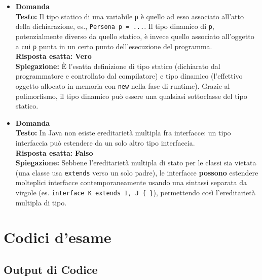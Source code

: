 \documentclass[12pt, a4paper]{article}
\begin{document}
\begin{itemize}
    \item {}\textbf{Domanda \thedomanda} \\
    \textbf{Testo:} Il tipo statico di una variabile \texttt{p} è quello ad esso associato all'atto della dichiarazione, es., \texttt{Persona p = ...}. Il tipo dinamico di \texttt{p}, potenzialmente diverso da quello statico, è invece quello associato all'oggetto a cui \texttt{p} punta in un certo punto dell'esecuzione del programma. \\
    \textbf{Risposta esatta:} \textbf{Vero} \\
    \textbf{Spiegazione:} È l'esatta definizione di tipo statico (dichiarato dal programmatore e controllato dal compilatore) e tipo dinamico (l'effettivo oggetto allocato in memoria con \texttt{new} nella fase di runtime). Grazie al polimorfismo, il tipo dinamico può essere una qualsiasi sottoclasse del tipo statico.
    \vspace{0.3cm}

    \item {}\textbf{Domanda \thedomanda} \\
    \textbf{Testo:} In Java non esiste ereditarietà multipla fra interfacce: un tipo interfaccia può estendere da un solo altro tipo interfaccia. \\
    \textbf{Risposta esatta:} \textbf{Falso} \\
    \textbf{Spiegazione:} Sebbene l'ereditarietà multipla di stato per le classi sia vietata (una classe usa \texttt{extends} verso un solo padre), le interfacce \textbf{possono} estendere molteplici interfacce contemporaneamente usando una sintassi separata da virgole (es. \texttt{interface K extends I, J \{ \}}), permettendo così l'ereditarietà multipla di tipo.
    \vspace{0.3cm}
\end{itemize}

\newpage

\section{Codici d'esame}

\subsection{Output di Codice}
\end{document}
